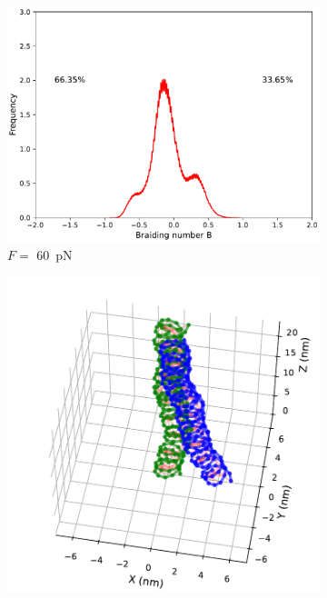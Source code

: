 \documentclass[a4paper,10pt]{article}
\begin{document}
\begin{figure}[tb]
\begin{subfigure}{.3\textwidth}
\includegraphics[width=\textwidth]{brF_60_br_pr.pdf}
\caption{$F=$ \SI{60}{\pico\newton}}
\label{fig:braF_b}
\end{subfigure}
\begin{subfigure}{.3\textwidth}
\includegraphics[width=\textwidth]{brF_100_2000000.pdf}

\end{subfigure}
\end{figure}
\end{document}
